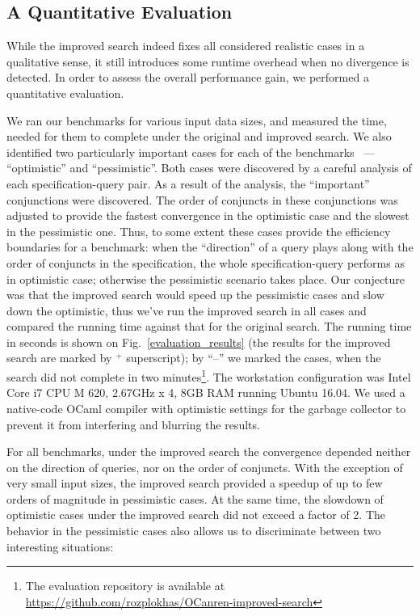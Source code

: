 \subsection{A Quantitative Evaluation}



While the improved search indeed fixes all considered realistic cases in a qualitative sense, it still introduces some runtime
overhead when no divergence is detected. In order to assess the overall performance gain, we performed a quantitative
evaluation.

We ran our benchmarks for various input data sizes, and measured the time, needed for them to complete under the original and
improved search. We also identified two particularly important cases for each of the benchmarks ~--- ``optimistic''
and ``pessimistic''. Both cases were discovered by a careful analysis of each specification-query pair. As a result of the
analysis, the ``important'' conjunctions were discovered. The order of conjuncts in these conjunctions was adjusted to provide
the fastest convergence in the optimistic case and the slowest in the pessimistic one. Thus, to some extent these
cases provide the efficiency boundaries for a benchmark: when the ``direction'' of a query plays along with the
order of conjuncts in the specification, the whole specification-query performs as in optimistic case; otherwise
the pessimistic scenario takes place. Our conjecture was that the improved search would speed up the pessimistic
cases and slow down the optimistic, thus we've run the improved search in all cases and compared the running time
against that for the original search. The running time in seconds is shown on Fig.~\ref{evaluation_results} (the results
for the improved search are marked by $^+$ superscript); by ``--'' we marked the cases, when the search did not
complete in two minutes\footnote{The evaluation repository is available at \url{https://github.com/rozplokhas/OCanren-improved-search}}.
The workstation configuration was Intel Core i7 CPU M 620, 2.67GHz x 4, 8GB RAM running Ubuntu 16.04. We used a
native-code OCaml compiler with optimistic settings for the garbage collector to prevent it from interfering and blurring the
results.

For all benchmarks, under the improved search the convergence depended neither on the direction of queries, nor on the
order of conjuncts. With the exception of very small input sizes, the improved search provided a speedup of up to
few orders of magnitude in pessimistic cases. At the same time, the slowdown of optimistic cases under
the improved search did not exceed a factor of 2. The behavior in the pessimistic cases also allows us to discriminate
between two interesting situations:

